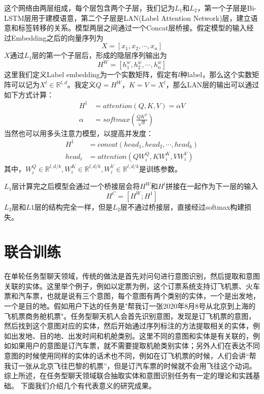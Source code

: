 \documentclass[twoside,a4paper,12pt]{book}%
\begin{document}
这个网络由两层组成，每个层包含两个子层，我们记为$L_1$和$L_2$，第一个子层是Bi-LSTM层用于建模语意，第二个子层是LAN(Label Attention Network)层，建立语意和标签转移的关系。模型两层之间通过一个Concat层桥接。假定模型的输入经过Embedding之后的向量序列为
$$
X=[x_1,x_2,\cdots,x_n]
$$
$X$通过$L_1$层的第一个子层后，形成的隐层序列输出为
$$
H^W=[h_1^w,h_2^w,\cdots,h_n^w]
$$
这里我们定义Label embedding为一个实数矩阵，假定有$l$种label，那么这个实数矩阵可以记为$X^l\in \mathbb{R}^{l,d}$。我定义$Q=H^W$，$K=V=X^l$，那么LAN层的输出可以通过如下方式计算：
$$
\begin{aligned}
H^1 &= attention(Q,K,V) = \alpha V \\
\alpha &= softmax(\frac{QK^T}{\sqrt{d}})
\end{aligned}
$$
当然也可以用多头注意力模型，以提高并发度：
$$
\begin{aligned}
H^1&=concat(head_1,head_2,\cdots,head_k) \\
head_i&=attention(QW_i^Q,KW_i^K,VW_i^V)
\end{aligned}
$$
其中，$W_i^Q \in \mathbb{R}^{l,d/k},W_i^K \in \mathbb{R}^{l,d/k},W_i^V \in \mathbb{R}^{l,d/k}$是训练参数。

$L_1$层计算完之后模型会通过一个桥接层会将$H^W$和$H^l$拼接在一起作为下一层的输入
$$
H^C=[H^W;H^1]
$$
$L_2$层和$L1$层的结构完全一样，但是$L_2$层不通过桥接层，直接经过softmax构建损失。

\section{联合训练}
在单轮任务型聊天领域，传统的做法是首先对问句进行意图识别，然后提取和意图关联的实体。这里举个例子，例如以定票为例，这个订票系统支持订飞机票、火车票和汽车票，也就是说有三个意图，每个意图有两个类别的实体，一个是出发地，一个是目的地。假如用户下达的任务是"帮我订一张2020年8月8号从北京到上海的飞机票商务舱机票"。任务型聊天机人会首先识别意图，发现是订飞机票的意图，然后找到这个意图对应的实体，然后开始通过序列标注的方法提取相关的实体，例如出发地、目的地、出发时间和机舱类别。这里不同的意图和实体是有关联的，例如如果用户的意图是订汽车票，就不需要提取机舱类别实体；另外人们在表达不同意图的时候使用同样的实体的话术也不同，例如在订飞机票的时候，人们会讲“帮我订一张从北京飞往巴黎的机票”，但是订汽车票的时候就不会用飞往这个动词。综上所述，在任务型聊天领域联合抽取实体和意图识别任务有一定的理论和实践基础。
下面我们介绍几个有代表意义的研究成果。
\end{document}
